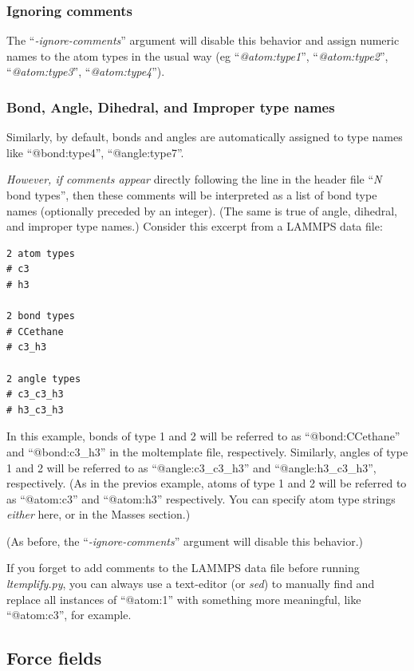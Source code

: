 \documentclass[11pt]{article}
\begin{document}
\subsubsection*{ Ignoring comments}

The ``\textit{-ignore-comments}'' argument will disable this behavior
and assign numeric names to the atom types in the usual way
(eg
``\textit{@atom:type1}'',
``\textit{@atom:type2}'',
``\textit{@atom:type3}'',
``\textit{@atom:type4}'').



\subsubsection*{ Bond, Angle, Dihedral, and Improper type names }

Similarly, by default, bonds and angles are automatically
assigned to type names like ``@bond:type4'',
``@angle:type7''.

\textit{However, if comments appear} directly following the line in the
header file ``\textit{N} bond types'', then these comments will be interpreted
as a list of bond type names (optionally preceded by an integer).
(The same is true of angle, dihedral, and improper type names.)
Consider this excerpt from a LAMMPS data file:
\begin{verbatim}
2 atom types
# c3
# h3

2 bond types
# CCethane
# c3_h3

2 angle types
# c3_c3_h3
# h3_c3_h3
\end{verbatim}

In this example, bonds of type 1 and 2 will be referred to as
``@bond:CCethane'' and ``@bond:c3\_h3''
in the moltemplate file, respectively.
Similarly, angles of type 1 and 2 will be referred to as
``@angle:c3\_c3\_h3'' and ``@angle:h3\_c3\_h3'', respectively.
(As in the previos example, atoms of type 1 and 2 will be referred to as
``@atom:c3'' and ``@atom:h3'' respectively.
You can specify atom type strings \textit{either} here,
or in the Masses section.)

(As before, the ``\textit{-ignore-comments}'' argument will disable this behavior.)

If you forget to add comments to the LAMMPS data file before running
\textit{ltemplify.py}, you can always use a text-editor (or \textit{sed})
to manually find and replace all instances of ``@atom:1'' with something
more meaningful, like ``@atom:c3'', for example.


\subsection{ Force fields}
\label{sec:ltemplify_force_fields}
\end{document}

